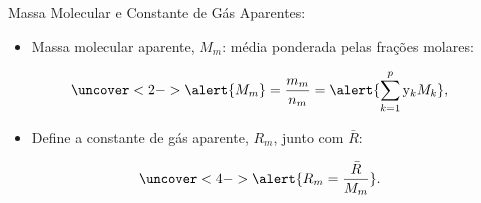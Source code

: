     \begin{frame}{Massa Molecular e Constante de Gás Aparentes:}\vspace*{-2em}
        \begin{itemize}
            \item<1-> Massa molecular aparente, \alert{$M_m$}: média ponderada pelas
                \alert{frações molares}:
        \end{itemize}
        \vspace*{0.8em}\begin{equation*}
            \uncover<2->{
                \alert{M_m} = \frac{m_m}{n_m} = \alert{\sum_{k=1}^p \mathrm{y}_k M_k},
            }
        \end{equation*}
        \vspace*{-0.8em}\begin{itemize}
            \item<3-> Define a constante de gás aparente, \alert{$R_m$}, junto com $\bar{R}$:
        \end{itemize}
        \vspace*{0.8em}\begin{equation*}
            \uncover<4->{
                \alert{R_m = \frac{\bar{R}}{M_m}}.
            }
        \end{equation*}
    \end{frame}

